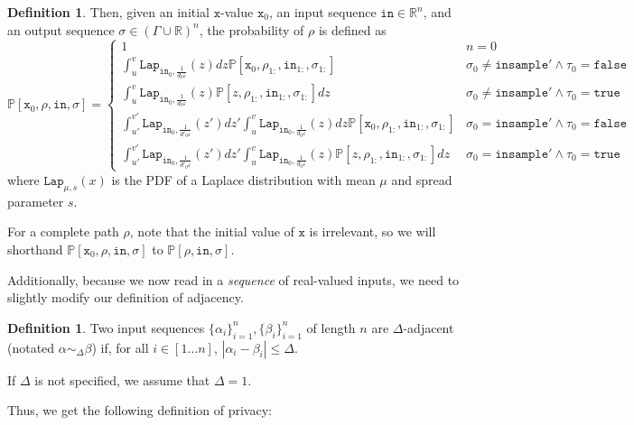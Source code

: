 \documentclass[12pt]{article}
\newcommand{\RR}{\mathbb{R}}
\newcommand{\PP}{\mathbb{P}}
\newcommand{\Lap}{\texttt{Lap}}
\theoremstyle{definition}
\newtheorem{defn}[thm]{Definition}
\begin{document}
\begin{defn}
    Then, given an initial $\texttt{x}$-value $\texttt{x}_0$, an input sequence $\texttt{in}\in \RR^n$, and an output sequence $\sigma\in (\Gamma\cup\RR)^n$, the probability of $\rho$ is defined as \[
        \PP[\texttt{x}_0, \rho, \texttt{in}, \sigma] = \begin{cases}
            1 & n = 0\\
            \int_u^v \Lap_{\texttt{in}_0, \frac{1}{d_0\varepsilon}}(z)dz\PP[\texttt{x}_0, \rho_{1:}, \texttt{in}_{1:}, \sigma_{1:}] & \sigma_0 \neq \texttt{insample}' \land \tau_0 = \texttt{false}\\
            \int_u^v \Lap_{\texttt{in}_0, \frac{1}{d_0\varepsilon}}(z)\PP[z, \rho_{1:}, \texttt{in}_{1:}, \sigma_{1:}]dz  & \sigma_0 \neq \texttt{insample}'\land \tau_0=\texttt{true} \\
            \int_{u'}^{v'}\Lap_{\texttt{in}_0, \frac{1}{d'_0\varepsilon}}(z')dz'\int_u^v \Lap_{\texttt{in}_0, \frac{1}{d_0\varepsilon}}(z)dz\PP[\texttt{x}_0, \rho_{1:}, \texttt{in}_{1:}, \sigma_{1:}]& \sigma_0 = \texttt{insample}'\land \tau_0 = \texttt{false}\\
            \int_{u'}^{v'}\Lap_{\texttt{in}_0, \frac{1}{d'_0\varepsilon}}(z')dz'\int_u^v \Lap_{\texttt{in}_0, \frac{1}{d_0\varepsilon}}(z)\PP[z, \rho_{1:}, \texttt{in}_{1:}, \sigma_{1:}]dz& \sigma_0 = \texttt{insample}'\land \tau_0 = \texttt{true}
        \end{cases}
    \]
    where $\Lap_{\mu, s}(x)$ is the PDF of a Laplace distribution with mean $\mu$ and spread parameter $s$.
\end{defn}

For a complete path $\rho$, note that the initial value of $\texttt{x}$ is irrelevant, so we will shorthand $\PP[\texttt{x}_0, \rho, \texttt{in}, \sigma]$ to $\PP[\rho, \texttt{in}, \sigma]$.

Additionally, because we now read in a \textit{sequence} of real-valued inputs, we need to slightly modify our definition of adjacency.

\begin{defn}
    Two input sequences $\{\alpha_i\}_{i=1}^n, \{\beta_i\}_{i=1}^n$ of length $n$ are $\Delta$-adjacent (notated $\alpha \sim_{\Delta}\beta$) if, for all $i\in [1\ldots n]$, $|\alpha_i-\beta_i|\leq \Delta$. 

    If $\Delta$ is not specified, we assume that $\Delta = 1$. 
\end{defn}

Thus, we get the following definition of privacy:
\end{document}
